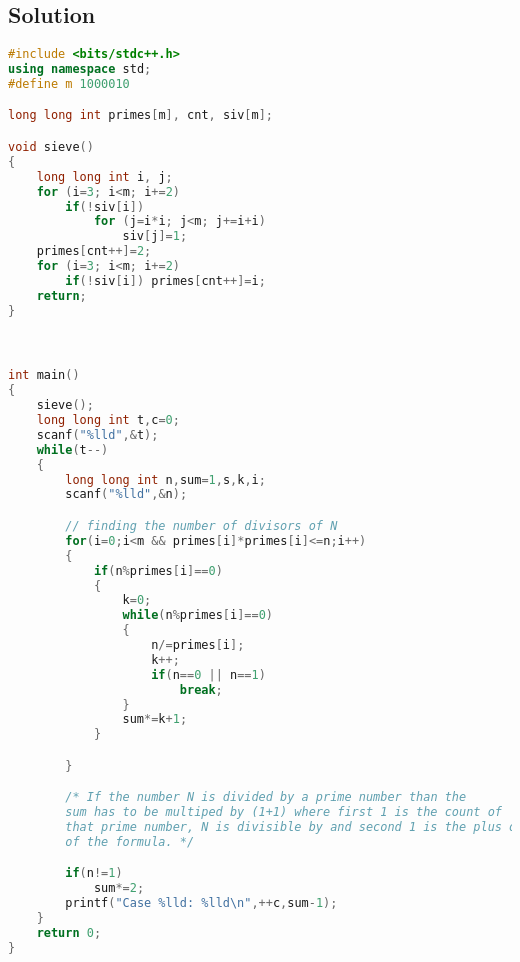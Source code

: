 \documentclass[10pt,a4paper]{article}
\begin{document}
\subsection*{Solution}
\begin{lstlisting}[language=C++, caption={Trailing Zeroes (I)}, label={1st:code}, mathescape=true, breaklines=true]
#include <bits/stdc++.h>
using namespace std;
#define m 1000010

long long int primes[m], cnt, siv[m];

void sieve()
{
    long long int i, j;
    for (i=3; i<m; i+=2)
        if(!siv[i])
            for (j=i*i; j<m; j+=i+i)
                siv[j]=1;
    primes[cnt++]=2;
    for (i=3; i<m; i+=2)
        if(!siv[i]) primes[cnt++]=i;
    return;
}



int main()
{
    sieve();
    long long int t,c=0;
    scanf("%lld",&t);
    while(t--)
    {
        long long int n,sum=1,s,k,i;
        scanf("%lld",&n);

        // finding the number of divisors of N
        for(i=0;i<m && primes[i]*primes[i]<=n;i++)
        {
            if(n%primes[i]==0)
            {
                k=0;
                while(n%primes[i]==0)
                {
                    n/=primes[i];
                    k++;
                    if(n==0 || n==1)
                        break;
                }
                sum*=k+1;
            }

        }

        /* If the number N is divided by a prime number than the
        sum has to be multiped by (1+1) where first 1 is the count of
        that prime number, N is divisible by and second 1 is the plus one
        of the formula. */

        if(n!=1)
            sum*=2;
        printf("Case %lld: %lld\n",++c,sum-1);
    }
    return 0;
}
\end{lstlisting}








\end{document}
